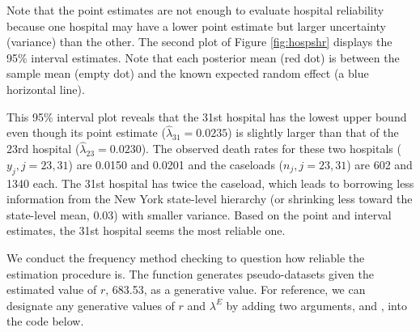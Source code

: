 \documentclass[article]{jss}
\begin{document}
Note that the point estimates are not enough to evaluate hospital reliability because one hospital may have a lower point estimate but  larger uncertainty (variance) than the other. The second plot of Figure \ref{fig:hospshr} displays the 95\% interval estimates. Note that each posterior mean (red dot) is between the sample mean (empty dot) and the known expected random effect (a blue horizontal line). %

This 95\% interval plot reveals that the 31st hospital has the lowest upper bound even though its point estimate ($\hat{\lambda}_{31}=0.0235$) is slightly larger than that of the 23rd hospital ($\hat{\lambda}_{23}=0.0230$). The observed death rates for these two hospitals ($y_{j}, j=23, 31$) are 0.0150 and 0.0201 and the caseloads ($n_{j}, j =23, 31$) are 602 and 1340 each. The 31st hospital has twice the caseload, which leads to borrowing less information from the New York state-level hierarchy (or shrinking less toward the state-level mean, 0.03) with smaller variance. Based on the point and interval estimates, the 31st hospital seems the most reliable one.

We conduct the frequency method checking to question how reliable the estimation procedure is.  The function   generates pseudo-datasets given the estimated value of $r$, 683.53, as a generative value. For reference, we can designate any generative values of $r$ and $\lambda^E$ by adding two arguments,  and , into the code below.

\end{document}
